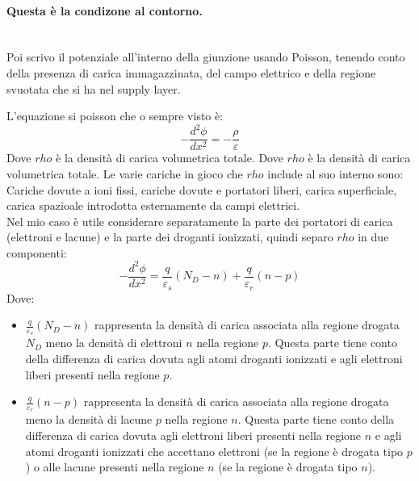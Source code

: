 \paragraph{Questa è la condizone al contorno. }\mbox{}\\
Poi scrivo il potenziale all'interno della giunzione usando Poisson, tenendo conto della presenza di carica immagazzinata, del campo elettrico e della regione svuotata che si ha nel supply layer.
\begin{ripasso}
    L'equazione si poisson che o sempre visto è:
    \begin{equation}
        -\frac{{d^2\phi}}{{dx^2}} = -\frac{\rho}{\varepsilon}
    \end{equation}
   Dove $rho$ è la densità di carica volumetrica totale.
   Dove $rho$ è la densità di carica volumetrica totale.
   Le varie cariche in gioco che $rho$ include al suo interno sono: 
   Cariche dovute a ioni fissi, cariche dovute e portatori liberi, carica superficiale, carica spazioale introdotta esternamente da campi elettrici.\\

   Nel mio caso è utile considerare separatamente la parte dei portatori di carica (elettroni e lacune) e la parte dei droganti ionizzati, quindi separo $rho$ in due componenti:
    \begin{equation}
        -\frac{{d^2\phi}}{{dx^2}} = \frac{{q}}{{\varepsilon_s}}(N_D - n) + \frac{{q}}{{\varepsilon_r}}(n - p)
    \end{equation}
    Dove:
    \begin{itemize}
      \item $\frac{q}{{\varepsilon_s}}(N_D - n)$ rappresenta la densità di carica associata alla regione drogata $N_D$ meno la densità di elettroni $n$ nella regione $p$. Questa parte tiene conto della differenza di carica dovuta agli atomi droganti ionizzati e agli elettroni liberi presenti nella regione $p$.
      
      \item $\frac{q}{{\varepsilon_r}}(n - p)$ rappresenta la densità di carica associata alla regione drogata meno la densità di lacune $p$ nella regione $n$. Questa parte tiene conto della differenza di carica dovuta agli elettroni liberi presenti nella regione $n$ e agli atomi droganti ionizzati che accettano elettroni (se la regione è drogata tipo $p$) o alle lacune presenti nella regione $n$ (se la regione è drogata tipo $n$).
    \end{itemize}
\end{ripasso}

